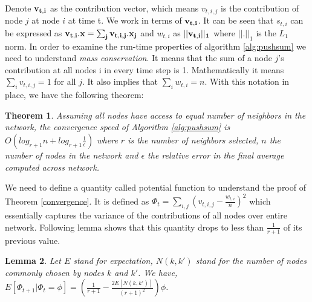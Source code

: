 \documentclass{article}
\newtheorem{convergence}{Theorem}[subsection]
\newtheorem{relativeerror}[convergence]{Lemma}
\begin{document}
Denote $\bf v_{t,i}$ as the contribution vector, which means $v_{t,i,j}$ is the contribution of node $j$ at node $i$ at time t. We work in terms of $\bf v_{t,i}$. It can be seen that $s_{t,i}$ can be expressed as $\bf v_{t,i}.x=\sum_j v_{t,i,j}.x_j$ and $w_{t,i}$ as $||\bf v_{t,i} ||_1$ where $||.||_1$ is the $L_1$ norm. In order to examine the run-time properties of algorithm \ref{alg:pushsum} we need to understand \emph{mass conservation}. It means that the sum of a node $j$'s contribution at all nodes i in every time step is 1. Mathematically it means $\sum_i v_{t,i,j}=1$ for all $j$. It also implies that $\sum_i w_{t,i}=n$. With this notation in place, we have the following theorem:

\begin{convergence}
Assuming all nodes have access to equal number of neighbors in the network, the convergence speed of Algorithm \ref{alg:pushsum} is $O(log_{r+1} n + log_{r+1} \frac{1}{\epsilon})$ where $r$ is the number of neighbors selected, $n$ the number of nodes in the network and $\epsilon$ the relative error in the final average computed across network.
\end{convergence}
We need to define a quantity called potential function to understand the proof of Theorem \ref{convergence}. It is defined as $\Phi_t = \sum_{i,j} (v_{t,i,j}-\frac{w_{t,i}}{n})^2$ which essentially captures the variance of the contributions of all nodes over entire network. Following lemma shows that this quantity drops to less than $\frac{1}{r+1}$ of its previous value.

\begin{relativeerror}
Let $E$ stand for expectation, $N(k,k')$ stand for the number of nodes commonly chosen by nodes $k$ and $k'$. We have, $E[\Phi_{t+1}|\Phi_t=\phi] = \left( \frac{1}{r+1} - \frac{2E[N(k,k')]}{(r+1)^2} \right) \phi $. 
\end{relativeerror}
\end{document}
